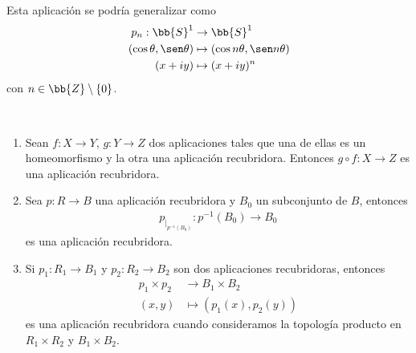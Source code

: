 \begin{ejemplo}
\begin{figure}[H]
%
    \end{figure}%

    Esta aplicación se podría generalizar como 
    \begin{align*}
        p_n : \bb{S}^1 & \to \bb{S}^1\\
        (\cos \theta, \sen \theta) &\mapsto (\cos n\theta, \sen n\theta)\\
        (x+iy) & \mapsto (x+iy)^n
    \end{align*}
    con $n\in \bb{Z}\setminus \{0\}$.
\end{ejemplo}

\begin{propiedades}\
    \begin{enumerate}
        \item Sean $f:X\to Y$, $g:Y\to Z$ dos aplicaciones tales que una de ellas es un homeomorfismo y la otra una aplicación recubridora. Entonces $g\circ f : X\to Z$ es una aplicación recubridora.

        \item Sea $p:R\to B$ una aplicación recubridora y $B_0$ un subconjunto de $B$, entonces
        \begin{align*}
            p_{|_{p^{-1}(B_0)}}:p^{-1}(B_0) \to B_0
        \end{align*}
        es una aplicación recubridora.

        \item Si $p_1:R_1\to B_1$ y $p_2:R_2\to B_2$ son dos aplicaciones recubridoras, entonces
        \begin{align*}
            p_1\times p_2 & \to B_1\times B_2\\
            (x,y) &\mapsto (p_1(x), p_2(y))
        \end{align*}
        es una aplicación recubridora cuando consideramos la topología producto en $R_1\times R_2$ y $B_1\times B_2$. 
    \end{enumerate}
\end{propiedades}


